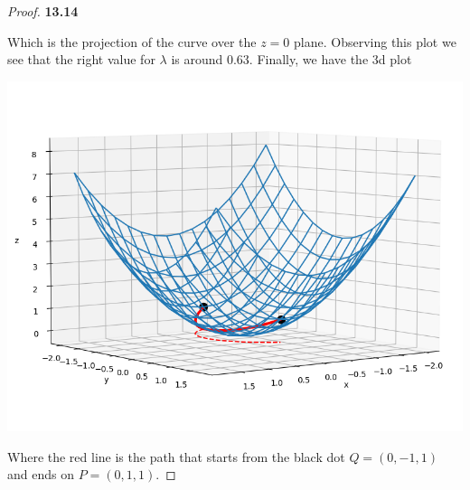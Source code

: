 \documentclass[11pt]{article}
\theoremstyle{definition}
\begin{document}
\begin{proof}{\textbf{13.14}}
\begin{center}
    \end{center}
    Which is the projection of the curve over the $z=0$ plane. Observing this
    plot we see that the right value for $\lambda$ is around 0.63.
    Finally, we have the 3d plot 
    \begin{center}
        \includegraphics[scale=0.5]{ch13-14.png}
    \end{center}
    Where the red line is the path that starts from the black dot
    $Q = (0, -1, 1)$ and ends on $P = (0, 1, 1)$.
\end{proof}
\end{document}
